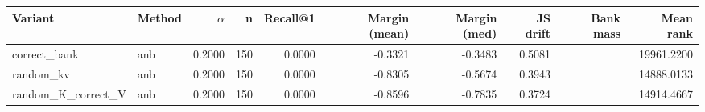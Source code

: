 \begin{tabular}{l l r r r r r r r r}
\toprule
Variant & Method & $\alpha$ & n & Recall@1 & Margin (mean) & Margin (med) & JS drift & Bank mass & Mean rank \\
\midrule
correct\_bank & anb & 0.2000 & 150 & 0.0000 & -0.3321 & -0.3483 & 0.5081 &  & 19961.2200 \\
random\_kv & anb & 0.2000 & 150 & 0.0000 & -0.8305 & -0.5674 & 0.3943 &  & 14888.0133 \\
random\_K\_correct\_V & anb & 0.2000 & 150 & 0.0000 & -0.8596 & -0.7835 & 0.3724 &  & 14914.4667 \\
\bottomrule
\end{tabular}
